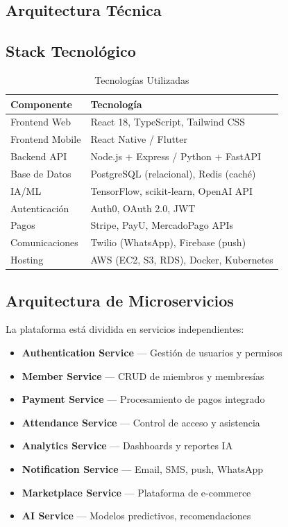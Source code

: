 \documentclass[11pt,a4paper]{article}
\begin{document}
\begin{itemize}
\section{Arquitectura Técnica}

\subsection{Stack Tecnológico}

\begin{table}[H]
\centering
\caption{Tecnologías Utilizadas}
\begin{tabular}{|l|l|}
\hline
\textbf{Componente} & \textbf{Tecnología} \\ \hline
Frontend Web & React 18, TypeScript, Tailwind CSS \\ \hline
Frontend Mobile & React Native / Flutter \\ \hline
Backend API & Node.js + Express / Python + FastAPI \\ \hline
Base de Datos & PostgreSQL (relacional), Redis (caché) \\ \hline
IA/ML & TensorFlow, scikit-learn, OpenAI API \\ \hline
Autenticación & Auth0, OAuth 2.0, JWT \\ \hline
Pagos & Stripe, PayU, MercadoPago APIs \\ \hline
Comunicaciones & Twilio (WhatsApp), Firebase (push) \\ \hline
Hosting & AWS (EC2, S3, RDS), Docker, Kubernetes \\ \hline
\end{tabular}
\end{table}

\subsection{Arquitectura de Microservicios}

La plataforma está dividida en servicios independientes:

\begin{itemize}
    \item \textbf{Authentication Service} — Gestión de usuarios y permisos
    \item \textbf{Member Service} — CRUD de miembros y membresías
    \item \textbf{Payment Service} — Procesamiento de pagos integrado
    \item \textbf{Attendance Service} — Control de acceso y asistencia
    \item \textbf{Analytics Service} — Dashboards y reportes IA
    \item \textbf{Notification Service} — Email, SMS, push, WhatsApp
    \item \textbf{Marketplace Service} — Plataforma de e-commerce
    \item \textbf{AI Service} — Modelos predictivos, recomendaciones
\end{itemize}


\end{itemize}
\end{document}
